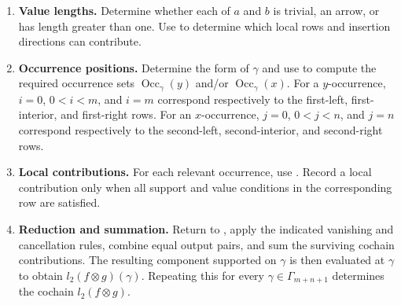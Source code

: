 \documentclass[11pt,a4paper,reqno]{amsart}
\newcommand{\Occ}{\operatorname{Occ}}
\theoremstyle{plain}
\theoremstyle{definition}
\numberwithin{equation}{section}
\begin{document}
	\begin{enumerate}[label=\textup{Step\arabic*:},leftmargin=*]
		\item \textbf{Value lengths.}
		Determine whether each of $a$ and $b$ is trivial, an arrow, or has length
		greater than one.  Use
		 to determine which local
		rows and insertion directions can contribute.
		
		\item \textbf{Occurrence positions.}
		Determine the form of $\gamma$ and use
		 to compute the required
		occurrence sets $\Occ_\gamma(y)$ and/or $\Occ_\gamma(x)$.  For a
		$y$-occurrence, $i=0$, $0<i<m$, and $i=m$ correspond respectively to the
		first-left, first-interior, and first-right rows.  For an $x$-occurrence,
		$j=0$, $0<j<n$, and $j=n$ correspond respectively to the second-left,
		second-interior, and second-right rows.
		
		\item \textbf{Local contributions.}
		For each relevant occurrence, use
		.  Record a local contribution
		only when all support and value conditions in the corresponding row are
		satisfied.
		
		\item \textbf{Reduction and summation.}
		Return to , apply the
		indicated vanishing and cancellation rules, combine equal output pairs,
		and sum the surviving cochain contributions.  The resulting component
		supported on $\gamma$ is then evaluated at $\gamma$ to obtain
		$l_2(f\otimes g)(\gamma)$.  Repeating this for every
		$\gamma\in\Gamma_{m+n+1}$ determines the cochain
		$l_2(f\otimes g)$.
	\end{enumerate}
	
\end{document}
